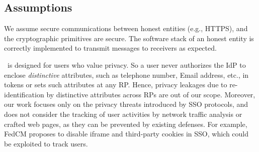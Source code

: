 \subsection{Assumptions}
We assume secure communications between honest entities (e.g., HTTPS), and the cryptographic primitives are secure. The software stack of an honest entity is correctly implemented to transmit messages to receivers as expected.

\usso\ is designed for users who value privacy. So a user never authorizes the IdP to enclose  \emph{distinctive} attributes, such as telephone number, Email address, etc., in tokens or sets such attributes at any RP. Hence, privacy leakages due to re-identification by distinctive attributes across RPs are out of our scope.
Moreover, our work focuses only on the privacy threats introduced by SSO protocols, and does not consider the tracking of user activities by network traffic analysis or crafted web pages, as they can be prevented by existing defenses.
For example, FedCM \cite{FedCM} proposes to disable iframe and third-party cookies in SSO, which could be exploited to track users.



